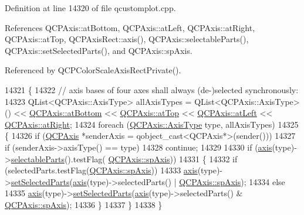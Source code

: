 Definition at line 14320 of file qcustomplot.\+cpp.



References Q\+C\+P\+Axis\+::at\+Bottom, Q\+C\+P\+Axis\+::at\+Left, Q\+C\+P\+Axis\+::at\+Right, Q\+C\+P\+Axis\+::at\+Top, Q\+C\+P\+Axis\+Rect\+::axis(), Q\+C\+P\+Axis\+::selectable\+Parts(), Q\+C\+P\+Axis\+::set\+Selected\+Parts(), and Q\+C\+P\+Axis\+::sp\+Axis.



Referenced by Q\+C\+P\+Color\+Scale\+Axis\+Rect\+Private().


\begin{DoxyCode}
14321 \{
14322   \textcolor{comment}{// axis bases of four axes shall always (de-)selected synchronously:}
14323   QList<QCPAxis::AxisType> allAxisTypes = QList<QCPAxis::AxisType>() << 
      \hyperlink{class_q_c_p_axis_ae2bcc1728b382f10f064612b368bc18aa220d68888516b6c3b493d144f1ba438f}{QCPAxis::atBottom} << \hyperlink{class_q_c_p_axis_ae2bcc1728b382f10f064612b368bc18aac0ece2b680d3f545e701f75af1655977}{QCPAxis::atTop} << 
      \hyperlink{class_q_c_p_axis_ae2bcc1728b382f10f064612b368bc18aaf84aa6cac6fb6099f54a2cbf7546b730}{QCPAxis::atLeft} << \hyperlink{class_q_c_p_axis_ae2bcc1728b382f10f064612b368bc18aadf5509f7d29199ef2f263b1dd224b345}{QCPAxis::atRight};
14324   \textcolor{keywordflow}{foreach} (\hyperlink{class_q_c_p_axis_ae2bcc1728b382f10f064612b368bc18a}{QCPAxis::AxisType} type, allAxisTypes)
14325   \{
14326     \textcolor{keywordflow}{if} (\hyperlink{class_q_c_p_axis}{QCPAxis} *senderAxis = qobject\_cast<QCPAxis*>(sender()))
14327       \textcolor{keywordflow}{if} (senderAxis->axisType() == type)
14328         \textcolor{keywordflow}{continue};
14329     
14330     \textcolor{keywordflow}{if} (\hyperlink{class_q_c_p_axis_rect_a560de44e47a4af0f86c59102a094b1e4}{axis}(type)->\hyperlink{class_q_c_p_axis_ad2bff3d2ed3d35c10d44c0c02441bd2c}{selectableParts}().testFlag(
      \hyperlink{class_q_c_p_axis_abee4c7a54c468b1385dfce2c898b115fa8949d2c1a31eccae9be7ed32e7a1ae38}{QCPAxis::spAxis}))
14331     \{
14332       \textcolor{keywordflow}{if} (selectedParts.testFlag(\hyperlink{class_q_c_p_axis_abee4c7a54c468b1385dfce2c898b115fa8949d2c1a31eccae9be7ed32e7a1ae38}{QCPAxis::spAxis}))
14333         \hyperlink{class_q_c_p_axis_rect_a560de44e47a4af0f86c59102a094b1e4}{axis}(type)->\hyperlink{class_q_c_p_axis_ab9d7a69277dcbed9119b3c1f25ca19c3}{setSelectedParts}(\hyperlink{class_q_c_p_axis_rect_a560de44e47a4af0f86c59102a094b1e4}{axis}(type)->selectedParts() | 
      \hyperlink{class_q_c_p_axis_abee4c7a54c468b1385dfce2c898b115fa8949d2c1a31eccae9be7ed32e7a1ae38}{QCPAxis::spAxis});
14334       \textcolor{keywordflow}{else}
14335         \hyperlink{class_q_c_p_axis_rect_a560de44e47a4af0f86c59102a094b1e4}{axis}(type)->\hyperlink{class_q_c_p_axis_ab9d7a69277dcbed9119b3c1f25ca19c3}{setSelectedParts}(\hyperlink{class_q_c_p_axis_rect_a560de44e47a4af0f86c59102a094b1e4}{axis}(type)->selectedParts() & ~
      \hyperlink{class_q_c_p_axis_abee4c7a54c468b1385dfce2c898b115fa8949d2c1a31eccae9be7ed32e7a1ae38}{QCPAxis::spAxis});
14336     \}
14337   \}
14338 \}
\end{DoxyCode}


